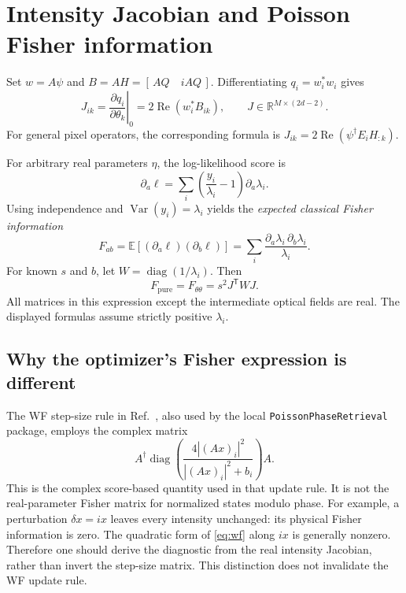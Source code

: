 \documentclass[11pt,a4paper]{article}
\newcommand{\R}{\mathbb R}
\newcommand{\E}{\mathbb E}
\newcommand{\diag}{\operatorname{diag}}
\newcommand{\RePart}{\operatorname{Re}}
\begin{document}
\section{Intensity Jacobian and Poisson Fisher information}
Set $w=A\psi$ and $B=AH=[\,AQ\quad iAQ\,]$. Differentiating
$q_i=w_i^*w_i$ gives
\begin{equation}
 J_{ik}=\left.\frac{\partial q_i}{\partial\theta_k}\right|_0
 =2\RePart(w_i^*B_{ik}),\qquad
 J\in\R^{M\times(2d-2)}. \label{eq:J}
\end{equation}
For general pixel operators, the corresponding formula is
$J_{ik}=2\RePart(\psi^\dagger E_i H_{:k})$.

For arbitrary real parameters $\eta$, the log-likelihood score is
\begin{equation}
 \partial_a\ell=\sum_i\left(\frac{y_i}{\lambda_i}-1\right)
 \partial_a\lambda_i.
\end{equation}
Using independence and $\operatorname{Var}(y_i)=\lambda_i$ yields the
\emph{expected classical Fisher information}
\begin{equation}
 F_{ab}=\E[(\partial_a\ell)(\partial_b\ell)]
 =\sum_i\frac{\partial_a\lambda_i\,\partial_b\lambda_i}{\lambda_i}.
 \label{eq:fisher}
\end{equation}
For known $s$ and $b$, let $W=\diag(1/\lambda_i)$. Then
\begin{equation}
 \boxed{F_{\mathrm{pure}}=F_{\theta\theta}=s^2J^{\mathsf T}WJ.} \label{eq:known}
\end{equation}
All matrices in this expression except the intermediate optical fields are
real. The displayed formulas assume strictly positive $\lambda_i$.

\subsection{Why the optimizer's Fisher expression is different}
The WF step-size rule in Ref.~\cite{li2022}, also used by the local
\texttt{PoissonPhaseRetrieval} package, employs the complex matrix
\begin{equation}
 A^\dagger\diag\!\left(\frac{4|(Ax)_i|^2}{|(Ax)_i|^2+b_i}\right)A.
 \label{eq:wf}
\end{equation}
This is the complex score-based quantity used in that update rule. It is
not the real-parameter Fisher matrix for normalized states modulo phase.
For example, a perturbation $\delta x=ix$ leaves every intensity unchanged:
its physical Fisher information is zero. The quadratic form of
\eqref{eq:wf} along $ix$ is generally nonzero. Therefore one should derive
the diagnostic from the real intensity Jacobian, rather than invert the
step-size matrix. This distinction does not invalidate the WF update rule.
\end{document}
